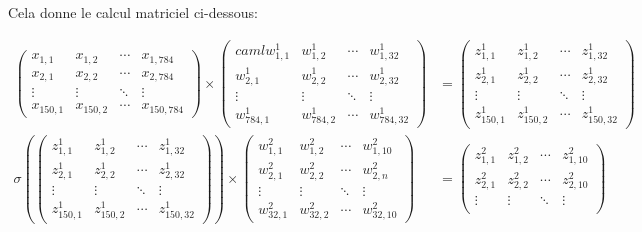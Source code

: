 Cela donne le calcul matriciel ci-dessous:
\begin{footnotesize}
\begin{align*}
\begin{pmatrix}
x_{1,1} & x_{1,2} & \cdots & x_{1,784} \\
x_{2,1} & x_{2,2} & \cdots & x_{2,784} \\
\vdots  & \vdots  & \ddots & \vdots  \\
x_{150,1} & x_{150,2} & \cdots & x_{150,784} 
\end{pmatrix}
\times
\begin{pmatrix}caml
w^1_{1,1} & w^1_{1,2} & \cdots & w^1_{1,32} \\
w^1_{2,1} & w^1_{2,2} & \cdots & w^1_{2,32} \\
\vdots  & \vdots  & \ddots & \vdots  \\
w^1_{784,1} & w^1_{784,2} & \cdots & w^1_{784,32} 
\end{pmatrix}
&= 
\begin{pmatrix}
z^1_{1,1} & z^1_{1,2} & \cdots & z^1_{1,32} \\
z^1_{2,1} & z^1_{2,2} & \cdots & z^1_{2,32} \\
\vdots  & \vdots  & \ddots & \vdots  \\
z^1_{150,1} & z^1_{150,2} & \cdots & z^1_{150,32} 
\end{pmatrix}
\\
\sigma(
\begin{pmatrix}
z^1_{1,1} & z^1_{1,2} & \cdots & z^1_{1,32} \\
z^1_{2,1} & z^1_{2,2} & \cdots & z^1_{2,32} \\
\vdots  & \vdots  & \ddots & \vdots  \\
z^1_{150,1} & z^1_{150,2} & \cdots & z^1_{150,32} 
\end{pmatrix}
)
\times
\begin{pmatrix}
w^2_{1,1} & w^2_{1,2} & \cdots & w^2_{1,10} \\
w^2_{2,1} & w^2_{2,2} & \cdots & w^2_{2,n} \\
\vdots  & \vdots  & \ddots & \vdots  \\
w^2_{32,1} & w^2_{32,2} & \cdots & w^2_{32,10} 
\end{pmatrix}
&= 
\begin{pmatrix}
z^2_{1,1} & z^2_{1,2} & \cdots & z^2_{1,10} \\
z^2_{2,1} & z^2_{2,2} & \cdots & z^2_{2,10} \\
\vdots  & \vdots  & \ddots & \vdots  \\

\end{pmatrix}
\end{align*}
\end{footnotesize}
